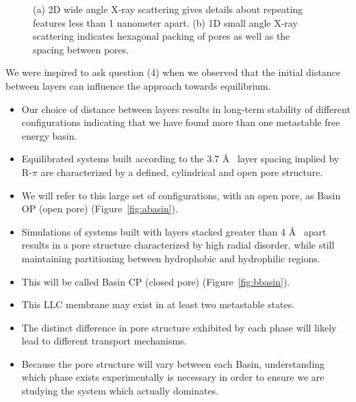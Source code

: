 \documentclass{article}
\newcommand{\angstrom}{\textup{\AA}}
\begin{document}
\begin{figure}[!ht]
\begin{subfigure}[t]{0.43\linewidth}
		\caption{}\label{fig:SAXS}
	\end{subfigure}
	\caption{(a) 2D wide angle X-ray scattering gives details about repeating
	features less than 1 nanometer apart. (b) 1D small angle X-ray scattering 
	indicates hexagonal packing of pores as well as the spacing between pores.}\label{fig:SWAXS}
  \end{figure}
  
  We were inspired to ask question (4) when we observed that the initial distance
  between layers can influence the approach towards equilibrium. 
  \begin{itemize}
  	\item Our choice of distance between layers results in long-term stability of 
	different configurations indicating that we have found more than one metastable
	free energy basin.
  	\item Equilibrated systems built according to the 3.7 \angstrom~ 
	layer spacing implied by R-$\pi$ are characterized by a defined, cylindrical and
	open pore structure.
        \item We will refer to this large set of configurations, with an open pore, as 
        Basin OP (open pore) (Figure~\ref{fig:abasin}).
	\item Simulations of systems built with layers stacked greater than 4 
	\angstrom~ apart results in a pore structure characterized by high radial 
	disorder, while still maintaining partitioning between hydrophobic and 
	hydrophilic regions.
	\item This will be called Basin CP (closed pore) (Figure~\ref{fig:bbasin}).
	\item This LLC membrane may exist in at least two metastable states.
	\item The distinct difference in pore structure exhibited by each phase will 
	likely lead to different transport mechanisms.
	\item Because the pore structure will vary between each Basin, understanding 
	which phase exists experimentally is necessary in order to ensure we are 
	studying the system which actually dominates.
  \end{itemize}
  
\end{document}
